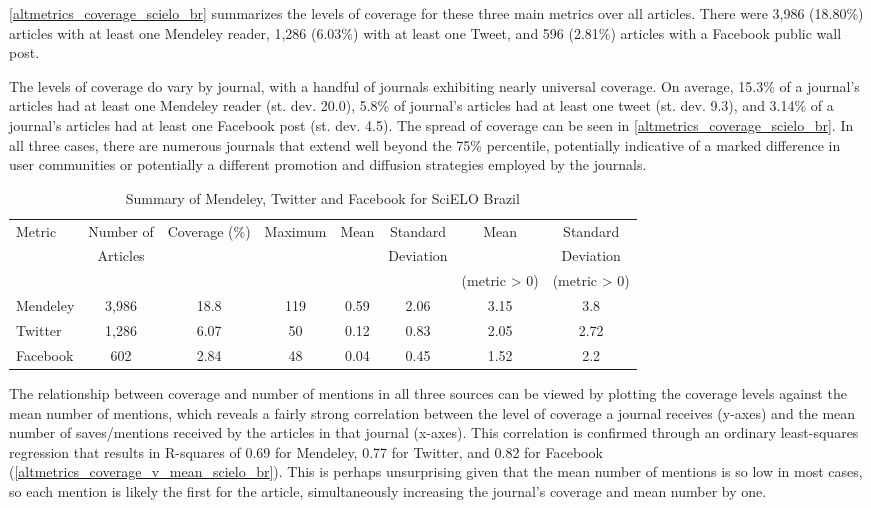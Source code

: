 \autoref{altmetrics_coverage_scielo_br} summarizes the levels of coverage for these three main metrics over all articles. There were 3,986 (18.80\%) articles with at least one Mendeley reader, 1,286 (6.03\%) with at least one Tweet, and 596 (2.81\%) articles with a Facebook public wall post.

The levels of coverage do vary by journal, with a handful of journals exhibiting nearly universal coverage. On average, 15.3\% of a journal's articles had at least one Mendeley reader (st. dev. 20.0), 5.8\% of journal's articles had at least one tweet (st. dev. 9.3), and 3.14\% of a journal's articles had at least one Facebook post (st. dev. 4.5). The spread of coverage can be seen in \autoref{altmetrics_coverage_scielo_br}. In all three cases, there are numerous journals that extend well beyond the 75\% percentile, potentially indicative of a marked difference in user communities or potentially a different promotion and diffusion strategies employed by the journals.



\begin{table}
\centering
\caption{Summary of Mendeley, Twitter and Facebook for SciELO Brazil} \label{altmetrics_summary_main_metrics_scielo_br}
\begin{tabular}{@{}lccccccc@{}}
\toprule
Metric  &   Number of   &   Coverage (\%)   &   Maximum &   Mean    &   Standard    &   Mean    &   Standard    \\
        &   Articles    &               &           &           &   Deviation   &           &   Deviation   \\
        &               &               &           &           &               &   (metric > 0) &  (metric > 0)            \\ \midrule
Mendeley    &   3,986   &   18.8    &   119 &   0.59    &   2.06    &   3.15    &   3.8 \\
Twitter &   1,286   &   6.07    &   50  &   0.12    &   0.83    &   2.05    &   2.72    \\
Facebook    &   602 &   2.84    &   48  &   0.04    &   0.45    &   1.52    &   2.2 \\ \bottomrule
\end{tabular}
\end{table}


The relationship between coverage and number of mentions in all three sources can be viewed by plotting the coverage levels against the mean number of mentions, which reveals a fairly strong correlation between the level of coverage a journal receives (y-axes) and the mean number of saves\slash mentions received by the articles in that journal (x-axes). This correlation is confirmed through an ordinary least-squares regression that results in R-squares of 0.69 for Mendeley, 0.77 for Twitter, and 0.82 for Facebook (\autoref{altmetrics_coverage_v_mean_scielo_br}). This is perhaps unsurprising given that the mean number of mentions is so low in most cases, so each mention is likely the first for the article, simultaneously increasing the journal's coverage and mean number by one.


